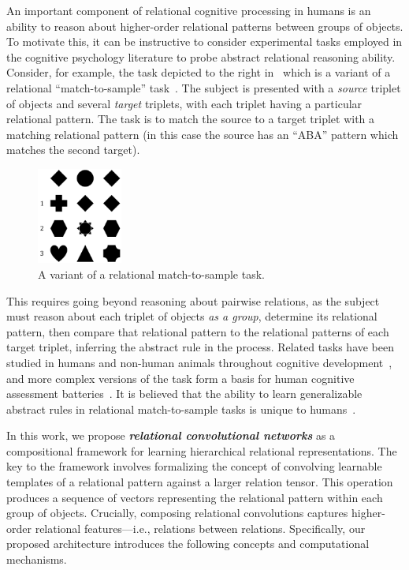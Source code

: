 An important component of relational cognitive processing in humans is an ability to reason about higher-order relational patterns between groups of objects. To motivate this, it can be instructive to consider experimental tasks employed in the cognitive psychology literature to probe abstract relational reasoning ability. Consider, for example, the task depicted to the right in~ which is a variant of a relational ``match-to-sample'' task~\citep{ferster1960intermittent, webbEmergentSymbols2021}. The subject is presented with a \textit{source} triplet of objects and several \textit{target} triplets, with each triplet having a particular relational pattern. The task is to match the source to a target triplet with a matching relational pattern (in this case the source has an ``ABA'' pattern which matches the second target).
\begin{figure}
    \includegraphics[width=0.25\textwidth]{figs/triplet_rmts_fig.pdf}
    \caption{A variant of a relational match-to-sample task.}\label{fig:rmts_example}
\end{figure}
This requires going beyond reasoning about pairwise relations, as the subject must reason about each triplet of objects \textit{as a group}, determine its relational pattern, then compare that relational pattern to the relational patterns of each target triplet, inferring the abstract rule in the process. Related tasks have been studied in humans and non-human animals throughout cognitive development~\citep{carpenter1990one,marcus1999rule,Hochmann2017ChildrensRO}, and more complex versions of the task form a basis for human cognitive assessment batteries~\citep{englund1987unified}. It is believed that the ability to learn generalizable abstract rules in relational match-to-sample tasks is unique to humans~\citep{fagot2001discriminating}.


In this work, we propose \textit{\bfseries relational convolutional networks} as a compositional framework for learning hierarchical relational representations. The key to the framework involves formalizing the concept of convolving learnable templates of a relational pattern against a larger relation tensor. This operation produces a sequence of vectors representing the relational pattern within each group of objects. Crucially, composing relational convolutions captures higher-order relational features---i.e., relations between relations. Specifically, our proposed architecture introduces the following concepts and computational mechanisms.

